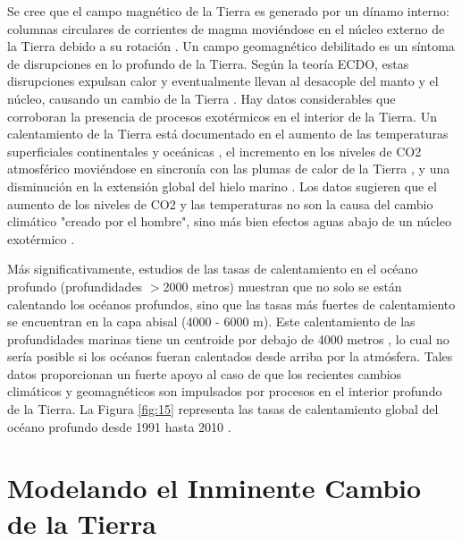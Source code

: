 \documentclass[10pt,twocolumn,letterpaper]{article}
\begin{document}
Se cree que el campo magnético de la Tierra es generado por un dínamo interno: columnas circulares de corrientes de magma moviéndose en el núcleo externo de la Tierra debido a su rotación \cite{123}. Un campo geomagnético debilitado es un síntoma de disrupciones en lo profundo de la Tierra. Según la teoría ECDO, estas disrupciones expulsan calor y eventualmente llevan al desacople del manto y el núcleo, causando un cambio de la Tierra \cite{1}.
Hay datos considerables que corroboran la presencia de procesos exotérmicos en el interior de la Tierra. Un calentamiento de la Tierra está documentado en el aumento de las temperaturas superficiales continentales y oceánicas \cite{127,128}, el incremento en los niveles de CO2 atmosférico moviéndose en sincronía con las plumas de calor de la Tierra \cite{129,130}, y una disminución en la extensión global del hielo marino \cite{131}. Los datos sugieren que el aumento de los niveles de CO2 y las temperaturas no son la causa del cambio climático "creado por el hombre", sino más bien efectos aguas abajo de un núcleo exotérmico \cite{129}.

Más significativamente, estudios de las tasas de calentamiento en el océano profundo (profundidades $>$2000 metros) muestran que no solo se están calentando los océanos profundos, sino que las tasas más fuertes de calentamiento se encuentran en la capa abisal (4000 - 6000 m). Este calentamiento de las profundidades marinas tiene un centroide por debajo de 4000 metros \cite{132,129}, lo cual no sería posible si los océanos fueran calentados desde arriba por la atmósfera. Tales datos proporcionan un fuerte apoyo al caso de que los recientes cambios climáticos y geomagnéticos son impulsados ​​por procesos en el interior profundo de la Tierra. La Figura \ref{fig:15} representa las tasas de calentamiento global del océano profundo desde 1991 hasta 2010 \cite{132}.

\section{Modelando el Inminente Cambio de la Tierra}
\end{document}

